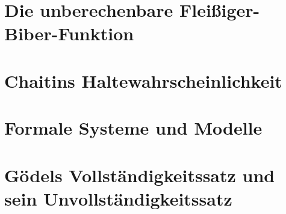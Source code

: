\documentclass[twoside]{../zirkelblatt1415}
\theoremstyle{definition}
\theoremstyle{plain}
\theoremstyle{remark}
\begin{document}
\section{Die unberechenbare Fleißiger-Biber-Funktion}

\section{Chaitins Haltewahrscheinlichkeit}

\section{Formale Systeme und Modelle}

\section{Gödels Vollständigkeitssatz und sein Unvollständigkeitssatz}
\end{document}
